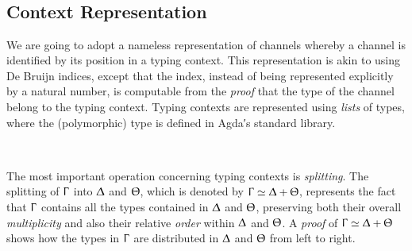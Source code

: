 \begin{code}[hide]
\AgdaSymbol{)}\AgdaSpace{}%
\AgdaSymbol{=}\AgdaSpace{}%
\AgdaSpace{}%
\AgdaSpace{}%
\AgdaSymbol{(}\AgdaSpace{}%
\AgdaSpace{}%
\AgdaSymbol{)}\AgdaSpace{}%
\AgdaSymbol{(}\AgdaSpace{}%
\AgdaSpace{}%
\AgdaSymbol{)}\<%
\\
%
\\[\AgdaEmptyExtraSkip]%
\>[0]\AgdaSpace{}%
\AgdaSpace{}%
\AgdaSpace{}%
\AgdaSymbol{=}\AgdaSpace{}%
\AgdaSpace{}%
\AgdaSymbol{(}\AgdaSpace{}%
\AgdaSymbol{)}\AgdaSpace{}%
\<%
\\
%
\\[\AgdaEmptyExtraSkip]%
\>[0]\AgdaSpace{}%
\AgdaSpace{}%
\AgdaSpace{}%
\AgdaSymbol{=}\AgdaSpace{}%
\AgdaSpace{}%
\AgdaSpace{}%
\AgdaSymbol{(}\AgdaSpace{}%
\AgdaSymbol{)}\<%
\end{code}

\subsection{Context Representation}
\label{sec:context-agda}

We are going to adopt a nameless representation of channels whereby a channel is
identified by its position in a typing context. This representation is akin to
using De Bruijn indices, except that the index, instead of being represented
explicitly by a natural number, is computable from the \emph{proof} that the
type of the channel belong to the typing context.
%
Typing contexts are represented using \emph{lists} of types, where the
(polymorphic)  type is defined in Agda′s standard library.

\begin{code}%
\>[0]\AgdaSpace{}%
\AgdaSymbol{:}\AgdaSpace{}%
\<%
\\
\>[0]\AgdaSpace{}%
\AgdaSymbol{=}\AgdaSpace{}%
\AgdaSpace{}%
\<%
\end{code}

The most important operation concerning typing contexts is \emph{splitting}. The
splitting of $\Upgamma$ into $\Updelta$ and $\Uptheta$, which is denoted by
$\Upgamma \simeq \Updelta + \Uptheta$, represents the fact that $\Upgamma$
contains all the types contained in $\Updelta$ and $\Uptheta$, preserving both
their overall \emph{multiplicity} and also their relative \emph{order} within
$\Updelta$ and $\Uptheta$. A \emph{proof} of
$\Upgamma \simeq \Updelta + \Uptheta$ shows how the types in $\Upgamma$ are
distributed in $\Updelta$ and $\Uptheta$ from left to right.

